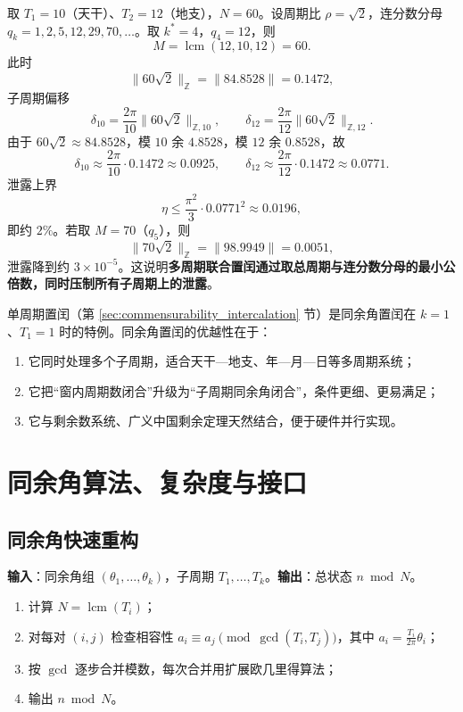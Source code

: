 \begin{example}[天干地支联合置闰]\label{ex:sexagenary_intercalation}
取 $T_1=10$（天干）、$T_2=12$（地支），$N=60$。设周期比 $\rho=\sqrt2$，连分数分母 $q_k=1,2,5,12,29,70,\dots$。取 $k^\ast=4$，$q_4=12$，则
\[
M=\operatorname{lcm}(12,10,12)=60.
\]
此时
\[
\|60\sqrt2\|_{\mathbb{Z}}=\|84.8528\|=0.1472,
\]
子周期偏移
\[
\delta_{10}=\frac{2\pi}{10}\|60\sqrt2\|_{\mathbb{Z},10},\qquad
\delta_{12}=\frac{2\pi}{12}\|60\sqrt2\|_{\mathbb{Z},12}.
\]
由于 $60\sqrt2\approx84.8528$，模 $10$ 余 $4.8528$，模 $12$ 余 $0.8528$，故
\[
\delta_{10}\approx\frac{2\pi}{10}\cdot0.1472\approx0.0925,\qquad
\delta_{12}\approx\frac{2\pi}{12}\cdot0.1472\approx0.0771.
\]
泄露上界
\[
\eta\le\frac{\pi^2}{3}\cdot0.0771^2\approx0.0196,
\]
即约 $2\%$。若取 $M=70$（$q_5$），则
\[
\|70\sqrt2\|_{\mathbb{Z}}=\|98.9949\|=0.0051,
\]
泄露降到约 $3\times10^{-5}$。这说明\textbf{多周期联合置闰通过取总周期与连分数分母的最小公倍数，同时压制所有子周期上的泄露}。
\end{example}

\begin{remark}[同余角置闰与单周期置闰的关系]\label{rem:congruence_vs_single_intercalation}
单周期置闰（第 \ref{sec:commensurability_intercalation} 节）是同余角置闰在 $k=1$、$T_1=1$ 时的特例。同余角置闰的优越性在于：
\begin{enumerate}[label=(\roman*)]
    \item 它同时处理多个子周期，适合天干—地支、年—月—日等多周期系统；
    \item 它把“窗内周期数闭合”升级为“子周期同余角闭合”，条件更细、更易满足；
    \item 它与剩余数系统、广义中国剩余定理天然结合，便于硬件并行实现。
\end{enumerate}
\end{remark}

\section{同余角算法、复杂度与接口}\label{sec:congruence_angle_algorithms}

\subsection{同余角快速重构}

\begin{definition}[同余角快速重构算法]\label{def:congruence_angle_fast_reconstruction}
\textbf{输入}：同余角组 $(\theta_1,\dots,\theta_k)$，子周期 $T_1,\dots,T_k$。\textbf{输出}：总状态 $n\bmod N$。
\begin{enumerate}[label=\textbf{步骤 \arabic*.}]
    \item 计算 $N=\operatorname{lcm}(T_i)$；
    \item 对每对 $(i,j)$ 检查相容性 $a_i\equiv a_j\pmod{\gcd(T_i,T_j)}$，其中 $a_i=\frac{T_i}{2\pi}\theta_i$；
    \item 按 $\gcd$ 逐步合并模数，每次合并用扩展欧几里得算法；
    \item 输出 $n\bmod N$。
\end{enumerate}
\end{definition}

